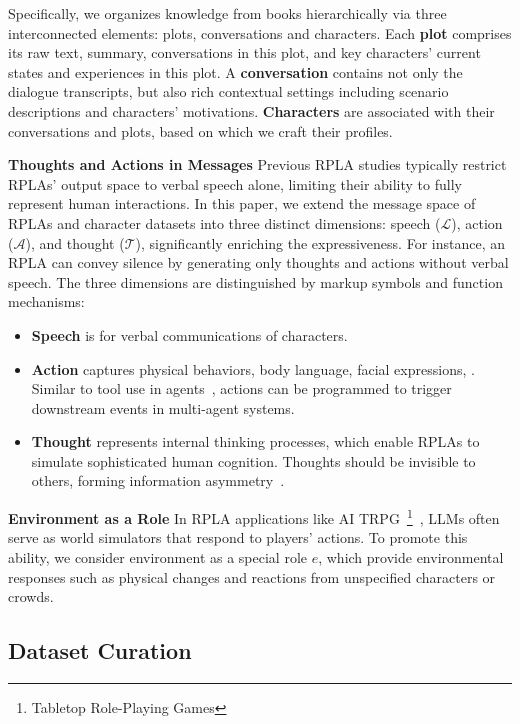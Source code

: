 Specifically, we organizes knowledge from books hierarchically via three interconnected elements: plots, conversations and characters. 
Each \textbf{plot} comprises its raw text, summary, conversations in this plot, and key characters' current states and experiences in this plot. 
A \textbf{conversation} contains not only the dialogue transcripts, but also rich contextual settings including scenario descriptions and characters' motivations. 
\textbf{Characters} are associated with their conversations and plots, based on which we craft their profiles. 

\textbf{Thoughts and Actions in Messages} \quad 
Previous RPLA studies typically restrict RPLAs' output space to verbal speech alone, limiting their ability to fully represent human interactions. 
In this paper, we extend the message space of RPLAs and character datasets into three distinct dimensions: speech ($\mathcal{L}$), action ($\mathcal{A}$), and thought ($\mathcal{T}$), significantly enriching the expressiveness. 
For instance, an RPLA can convey silence by generating only thoughts and actions without verbal speech. 
The three dimensions are distinguished by markup symbols and function mechanisms:  
\begin{itemize}[itemsep=-3pt, topsep=0pt, partopsep=0pt]
    \item \textbf{Speech} is for verbal communications of characters.
    \item \textbf{Action} captures physical behaviors, body language, facial expressions, \etc. Similar to  tool use in agents~\citep{weng2023agent}, actions can be programmed to trigger downstream events in multi-agent systems. 
    \item \textbf{Thought} represents internal thinking processes, which enable RPLAs to simulate sophisticated human cognition. 
    Thoughts should be invisible to others, forming  information asymmetry~\citep{zhou2024sotopia}. 
\end{itemize}

\textbf{Environment as a Role} \quad 
In RPLA applications like AI TRPG~\footnote{Tabletop Role-Playing Games}~\citep{liang2023tachikuma}, LLMs often serve as world simulators that respond to players' actions. 
To promote this ability, we consider environment as a special role $e$, which provide environmental responses such as physical changes and reactions from unspecified characters or crowds.

\subsection{Dataset Curation} 
\label{sec:data_pipeline}

